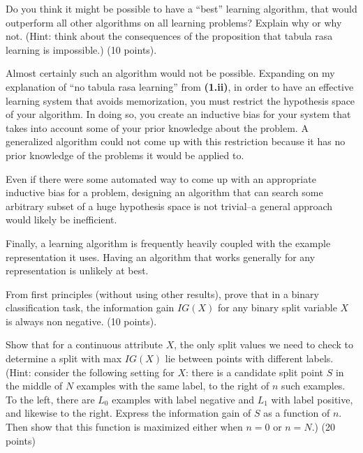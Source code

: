 \documentclass[fleqn]{homework}
\begin{document}
  \begin{problem}{2}
    \begin{question}
      Do you think it might be possible to have a ``best'' learning algorithm,
      that would outperform all other algorithms on all learning problems?
      Explain why or why not.  (Hint: think about the consequences of the
      proposition that tabula rasa learning is impossible.) (10 points).
    \end{question}

    Almost certainly such an algorithm would not be possible.  Expanding on my
    explanation of ``no tabula rasa learning'' from \textbf{(1.ii)}, in order to
    have an effective learning system that avoids memorization, you must
    restrict the hypothesis space of your algorithm.  In doing so, you create an
    inductive bias for your system that takes into account some of your prior
    knowledge about the problem.  A generalized algorithm could not come up with
    this restriction because it has no prior knowledge of the problems it would
    be applied to.

    Even if there were some automated way to come up with an appropriate
    inductive bias for a problem, designing an algorithm that can search some
    arbitrary subset of a huge hypothesis space is not trivial--a general
    approach would likely be inefficient.

    Finally, a learning algorithm is frequently heavily coupled with the example
    representation it uses.  Having an algorithm that works generally for any
    representation is unlikely at best.
  \end{problem}

  \begin{problem}{3}
    \begin{question}
      From first principles (without using other results), prove that in a
      binary classification task, the information gain $IG(X)$ for any binary
      split variable $X$ is always non negative. (10 points).
    \end{question}
  \end{problem}

  \begin{problem}{4}
    \begin{question}
      Show that for a continuous attribute $X$, the only split values we need to
      check to determine a split with max $IG(X)$ lie between points with
      different labels.  (Hint: consider the following setting for $X$: there is
      a candidate split point $S$ in the middle of $N$ examples with the same
      label, to the right of $n$ such examples.  To the left, there are $L_0$
      examples with label negative and $L_1$ with label positive, and likewise
      to the right.  Express the information gain of $S$ as a function of $n$.
      Then show that this function is maximized either when $n=0$ or $n=N$.) (20
      points)
    \end{question}
  \end{problem}
\end{document}
